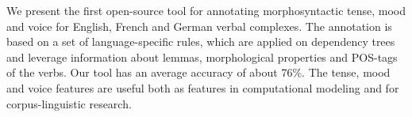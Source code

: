 We present the first open-source tool for annotating morphosyntactic tense, mood and voice for English, French and German verbal complexes. The annotation is based on a set of language-specific rules, which are applied on dependency trees and leverage information about lemmas, morphological properties and POS-tags of the verbs. Our tool has an average accuracy of about 76\%. The tense, mood and voice features are useful both as features in computational modeling and for corpus-linguistic research.
